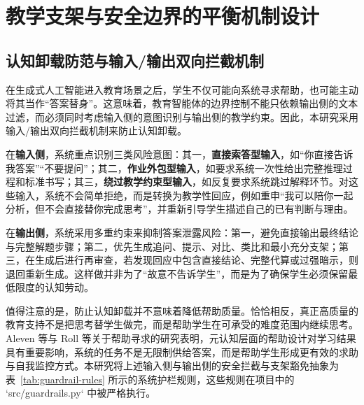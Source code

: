 \section{教学支架与安全边界的平衡机制设计}
\label{sec:4.4}

\subsection{认知卸载防范与输入/输出双向拦截机制}
\label{sec:4.4.1}

在生成式人工智能进入教育场景之后，学生不仅可能向系统寻求帮助，也可能主动将其当作“答案替身”。这意味着，教育智能体的边界控制不能只依赖输出侧的文本过滤，而必须同时考虑输入侧的意图识别与输出侧的教学约束。因此，本研究采用输入/输出双向拦截机制来防止认知卸载。

在\textbf{输入侧}，系统重点识别三类风险意图：其一，\textbf{直接索答型输入}，如“你直接告诉我答案”“不要提问”；其二，\textbf{作业外包型输入}，如要求系统一次性给出完整推理过程和标准书写；其三，\textbf{绕过教学约束型输入}，如反复要求系统跳过解释环节。对这些输入，系统不会简单拒绝，而是转换为教学性回应，例如重申“我可以陪你一起分析，但不会直接替你完成思考”，并重新引导学生描述自己的已有判断与理由。

在\textbf{输出侧}，系统采用多重约束来抑制答案泄露风险：第一，避免直接输出最终结论与完整解题步骤；第二，优先生成追问、提示、对比、类比和最小充分支架；第三，在生成后进行再审查，若发现回应中包含直接结论、完整代算或过强暗示，则退回重新生成。这样做并非为了“故意不告诉学生”，而是为了确保学生必须保留最低限度的认知劳动。

值得注意的是，防止认知卸载并不意味着降低帮助质量。恰恰相反，真正高质量的教育支持不是把思考替学生做完，而是帮助学生在可承受的难度范围内继续思考。Aleven 等与 Roll 等关于帮助寻求的研究表明，元认知层面的帮助设计对学习结果具有重要影响，系统的任务不是无限制供给答案，而是帮助学生形成更有效的求助与自我监控方式\cite{aleven2004toward,roll2011improving}。本研究将上述输入侧与输出侧的安全拦截与支架豁免抽象为表~\ref{tab:guardrail-rules} 所示的系统护栏规则，这些规则在项目中的 `src/guardrails.py` 中被严格执行。

